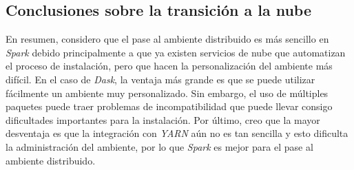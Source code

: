 \subsection{Conclusiones sobre la transición a la nube}

En resumen, considero que el pase al ambiente distribuido es más sencillo en \textit{Spark} debido principalmente a que ya existen servicios de nube que automatizan el proceso de instalación, pero que hacen la personalización del ambiente más difícil. En el caso de \textit{Dask}, la ventaja más grande es que se puede utilizar fácilmente un ambiente muy personalizado. Sin embargo, el uso de múltiples paquetes puede traer problemas de incompatibilidad que puede llevar consigo dificultades importantes para la instalación. Por último, creo que la mayor desventaja es que la integración con \textit{YARN} aún no es tan sencilla y esto dificulta la administración del ambiente, por lo que \textit{Spark} es mejor para el pase al ambiente distribuido. 
